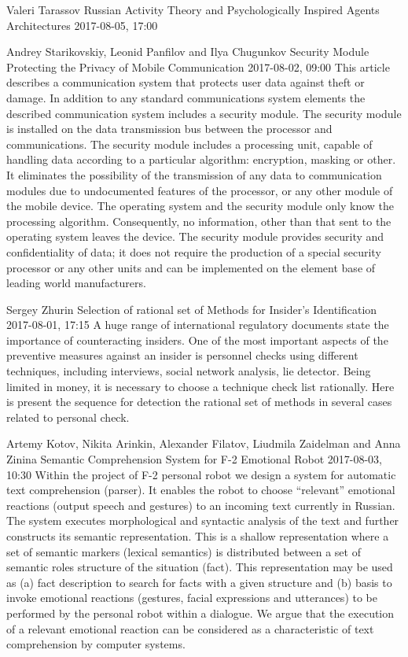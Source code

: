 \documentclass[10pt,fleqn,openany]{book} %
\begin{document}
\begin{enumerate}
		
		\paperabstract
		{Valeri Tarassov}
		{Russian Activity Theory and Psychologically Inspired Agents Architectures}
		{2017-08-05, 17:00}
		{}
		
		
		\paperabstract
		{Andrey Starikovskiy, Leonid Panfilov and Ilya Chugunkov}
		{Security Module Protecting the Privacy of Mobile Communication}
		{2017-08-02, 09:00}
		{This article describes a communication system that protects user data against theft or damage. In addition to any standard communications system elements the described communication system includes a security module. The security module is installed on the data transmission bus between the processor and communications. The security module includes a processing unit, capable of handling data according to a particular algorithm: encryption, masking or other. It eliminates the possibility of the transmission of any data to communication modules due to undocumented features of the processor, or any other module of the mobile device. The operating system and the security module only know the processing algorithm. Consequently, no information, other than that sent to the operating system leaves the device. The security module provides security and confidentiality of data; it does not require the production of a special security processor or any other units and can be implemented on the element base of leading world manufacturers.}
		
		
		\paperabstract
		{Sergey Zhurin}
		{Selection of rational set of Methods for Insider's Identification}
		{2017-08-01, 17:15}
		{A huge range of international regulatory documents state the importance of counteracting insiders. One of the most important aspects of the preventive measures against an insider is personnel checks using different techniques, including interviews, social network analysis, lie detector. Being limited in money, it is necessary to choose a technique check list rationally. Here is present the sequence for detection the rational set of methods in several cases related to personal check.}
		
		
		\paperabstract
		{Artemy Kotov, Nikita Arinkin, Alexander Filatov, Liudmila Zaidelman and Anna Zinina}
		{Semantic Comprehension System for F-2 Emotional Robot}
		{2017-08-03, 10:30}
		{Within the project of F-2 personal robot we design a system for automatic text comprehension (parser). It enables the robot to choose ``relevant'' emotional reactions (output speech and gestures) to an incoming text  currently in Russian. The system executes morphological and syntactic analysis of the text and further constructs its semantic representation. This is a shallow representation where a set of semantic markers (lexical semantics) is distributed between a set of semantic roles  structure of the situation (fact). This representation may be used as (a) fact description  to search for facts with a given structure and (b) basis to invoke emotional reactions (gestures, facial expressions and utterances) to be performed by the personal robot within a dialogue. We argue that the execution of a relevant emotional reaction can be considered as a characteristic of text comprehension by computer systems.}
		

\end{enumerate}
\end{document}
